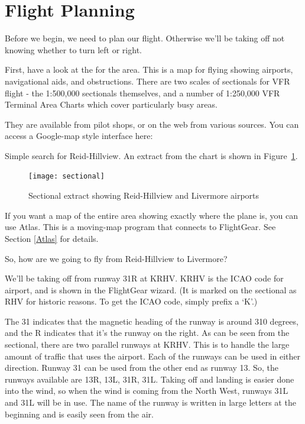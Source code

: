 \section{Flight Planning}

Before we begin, we need to plan our flight.
Otherwise we'll be taking off not knowing whether to turn left or right.

First, have a look at the  for the area. This is a map for
flying showing airports, navigational aids, and obstructions.
There are two scales of sectionals for VFR flight -
the 1:500,000 sectionals themselves, and a number of
1:250,000 VFR Terminal Area Charts which cover particularly busy areas.

They are available from pilot shops, or on the web from various sources.
You can access a Google-map style interface here:

\medskip
{}
\medskip

Simple search for Reid-Hillview. An extract from the chart is shown in Figure~\ref{sectional}.

\begin{figure}[!htp]
\centering
\texttt{[image: sectional]}
\caption{Sectional extract showing Reid-Hillview and Livermore airports\label{sectional}}
\end{figure}

If you want a map of the entire area showing exactly where the plane is,
you can use Atlas.
This is a moving-map program that connects to FlightGear. See Section \ref{Atlas} for details.

So, how are we going to fly from Reid-Hillview to Livermore?

We'll be taking off from runway 31R at KRHV. KRHV is the ICAO code
for  airport, and is shown in the FlightGear wizard.
(It is marked on the sectional as RHV for historic reasons.
To get the ICAO code, simply prefix a `K'.)

The 31 indicates that the magnetic heading of the runway is around 310 degrees,
and the R indicates that it's the runway on the right. As can be seen from the
sectional, there are two parallel runways at KRHV. This is to handle the large
amount of traffic that uses the airport. Each of the runways can be used in
either direction. Runway 31 can be used from the other end as runway 13.
So, the runways available are 13R, 13L, 31R, 31L. Taking off and landing
is easier done into the wind, so when the wind is coming from the North West,
runways 31L and 31L will be in use. The name of the runway is written in large
letters at the beginning and is easily seen from the air.


